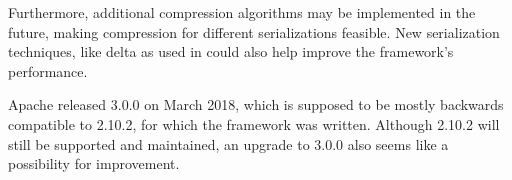Furthermore, additional compression algorithms may be implemented in the future, making compression for different serializations feasible. New serialization techniques, like delta \cas{} as used in \cite{epstein2012making} could also help improve the framework's performance.

Apache released \uima{} 3.0.0 on March 2018, which is supposed to be mostly backwards compatible to \uima{} 2.10.2, for which the framework was written. Although \uima{} 2.10.2 will still be supported and maintained, an upgrade to \uima{} 3.0.0 also seems like a possibility for improvement.